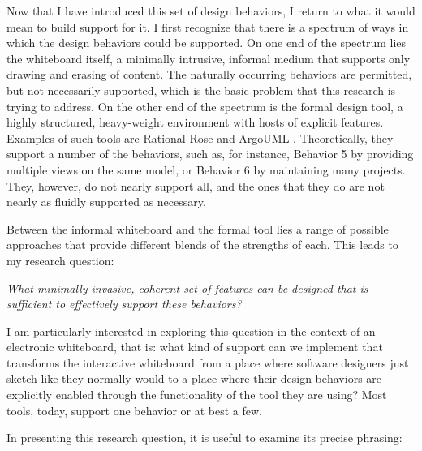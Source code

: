 \documentclass[12pt,fleqn]{ucithesis}
\begin{document}
Now that I have introduced this set of design behaviors, I return to what it would mean to build support for it. I first recognize that there is a spectrum of ways in which the design behaviors could be supported. On one end of the spectrum lies the whiteboard itself, a minimally intrusive, informal medium that supports only drawing and erasing of content. The naturally occurring behaviors are permitted, but not necessarily supported, which is the basic problem that this research is trying to address. On the other end of the spectrum is the formal design tool, a highly structured, heavy-weight environment with hosts of explicit features. Examples of such tools are Rational Rose \cite{Quatrani} and ArgoUML \cite{robbins2000cognitive}. Theoretically, they support a number of the behaviors, such as, for instance, Behavior 5 by providing multiple views on the same model, or Behavior 6 by maintaining many projects. They, however, do not nearly support all, and the ones that they do are not nearly as fluidly supported as necessary. 

Between the informal whiteboard and the formal tool lies a range of possible approaches that provide different blends of the strengths of each. This leads to my research question:

    \newenvironment{myindentpar}[1]%
     {\begin{list}{}%
             {\setlength{\leftmargin}{#1}}%
             \item[]%
     }
     {\end{list}}

\begin{myindentpar}{1cm}
\emph{What minimally invasive, coherent set of features can be designed that is sufficient to effectively support these behaviors?}
\end{myindentpar}

I am particularly interested in exploring this question in the context of an electronic whiteboard, that is: what kind of support can we implement that transforms the interactive whiteboard from a place where software designers just sketch like they normally would to a place where their design behaviors are explicitly enabled through the functionality of the tool they are using? Most tools, today, support one behavior or at best a few.

In presenting this research question, it is useful to examine its precise phrasing:
\end{document}

